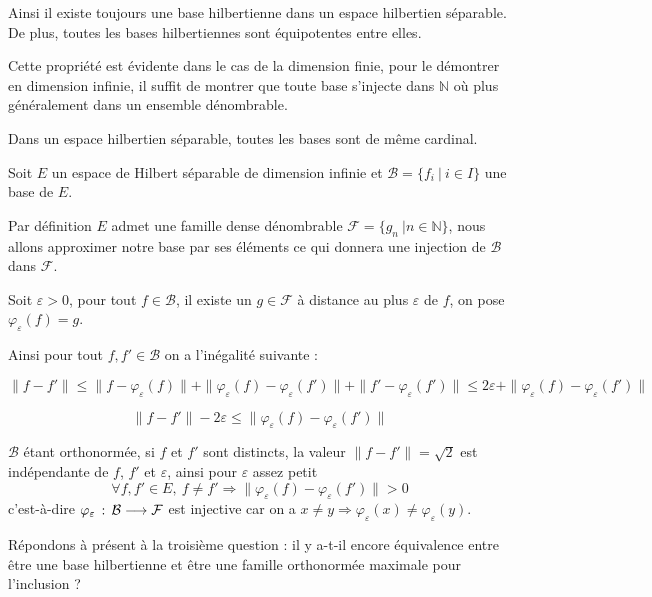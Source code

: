 	Ainsi il existe toujours une base hilbertienne dans un espace hilbertien séparable. De plus, toutes les bases hilbertiennes sont équipotentes entre elles.
	
	Cette propriété est évidente dans le cas de la dimension finie, pour le démontrer en dimension infinie, il suffit de montrer que toute base s'injecte dans $\mathbb{N}$ où plus généralement dans un ensemble dénombrable.
	
	\begin{myproposition}
		Dans un espace hilbertien séparable, toutes les bases sont de même cardinal.
	\end{myproposition}
	
	\begin{myproof}
		Soit $E$ un espace de Hilbert séparable de dimension infinie et $\mathcal{B} = \{f_i ~ | ~ i \in I\}$ une base de $E$.
		
		Par définition $E$ admet une famille dense dénombrable $\mathcal{F} = \{g_n ~ | n \in \mathbb{N}\}$, nous allons approximer notre base par ses éléments ce qui donnera une injection de $\mathcal{B}$ dans $\mathcal{F}$.
		
		Soit $\varepsilon > 0$, pour tout $f \in \mathcal{B}$, il existe un $g \in \mathcal{F}$ à distance au plus $\varepsilon$ de $f$, on pose $\varphi_\varepsilon(f) = g$.
		
		Ainsi pour tout $f, f' \in \mathcal{B}$ on a l'inégalité suivante :
		
		$$\|f - f'\| \leqslant \|f - \varphi_\varepsilon(f)\| + \|\varphi_\varepsilon(f) - \varphi_\varepsilon(f')\| + \|f' - \varphi_\varepsilon(f')\| \leqslant 2 \varepsilon + \|\varphi_\varepsilon(f) - \varphi_\varepsilon(f')\|$$
		
		$$\|f - f'\| - 2 \varepsilon \leqslant \|\varphi_\varepsilon(f) - \varphi_\varepsilon(f')\|$$
		
		$\mathcal{B}$ étant orthonormée, si $f$ et $f'$ sont distincts, la valeur $\|f-f'\| = \sqrt{2}$ est indépendante de $f$, $f'$ et $\varepsilon$, ainsi pour $\varepsilon$ assez petit $$\forall f, f' \in E, ~ f \neq f' \Longrightarrow \|\varphi_\varepsilon(f) - \varphi_\varepsilon(f')\| > 0$$ c'est-à-dire $\varphi_\varepsilon \, : \, \mathcal{B} \longrightarrow \mathcal{F}$ est injective car on a $x \neq y \Longrightarrow \varphi_\varepsilon(x) \neq \varphi_\varepsilon(y)$.
		
		\cqfd
	\end{myproof}
	
	Répondons à présent à la troisième question : il y a-t-il encore équivalence entre être une base hilbertienne et être une famille orthonormée maximale pour l'inclusion ?
	
